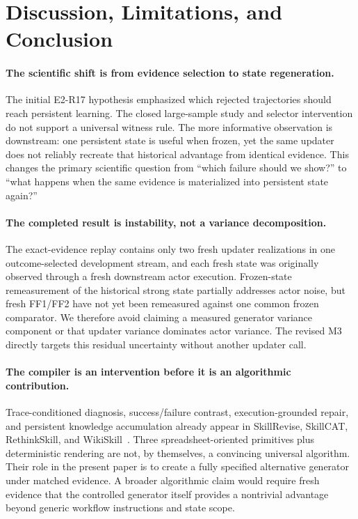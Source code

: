 \section{Discussion, Limitations, and Conclusion}
\label{sec:discussion}

\paragraph{The scientific shift is from evidence selection to state regeneration.}
The initial E2-R17 hypothesis emphasized which rejected trajectories should reach persistent learning. The closed large-sample study and selector intervention do not support a universal witness rule. The more informative observation is downstream: one persistent state is useful when frozen, yet the same updater does not reliably recreate that historical advantage from identical evidence. This changes the primary scientific question from ``which failure should we show?'' to ``what happens when the same evidence is materialized into persistent state again?''

\paragraph{The completed result is instability, not a variance decomposition.}
The exact-evidence replay contains only two fresh updater realizations in one outcome-selected development stream, and each fresh state was originally observed through a fresh downstream actor execution. Frozen-state remeasurement of the historical strong state partially addresses actor noise, but fresh FF1/FF2 have not yet been remeasured against one common frozen comparator. We therefore avoid claiming a measured generator variance component or that updater variance dominates actor variance. The revised M3 directly targets this residual uncertainty without another updater call.

\paragraph{The compiler is an intervention before it is an algorithmic contribution.}
Trace-conditioned diagnosis, success/failure contrast, execution-grounded repair, and persistent knowledge accumulation already appear in SkillRevise, SkillCAT, RethinkSkill, and WikiSkill~\citep{liu2026skillrevise,chen2026skillcat,liu2026rethinkskill,tang2026wikiskill}. Three spreadsheet-oriented primitives plus deterministic rendering are not, by themselves, a convincing universal algorithm. Their role in the present paper is to create a fully specified alternative generator under matched evidence. A broader algorithmic claim would require fresh evidence that the controlled generator itself provides a nontrivial advantage beyond generic workflow instructions and state scope.

